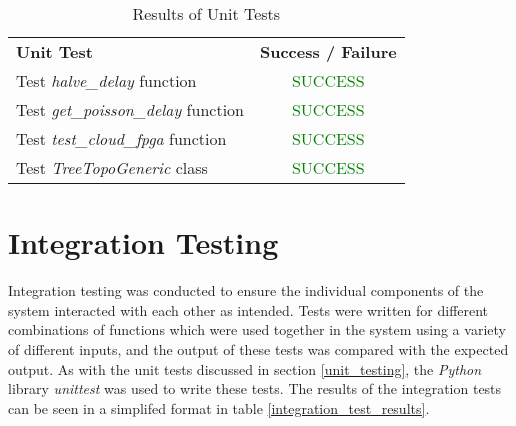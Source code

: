 \begin{table}[t]
  \caption{Results of Unit Tests}
  \begin{center}
    \begin{tabularx}{\textwidth}{|Y|c|} \hline
      \textbf{Unit Test} & \textbf{Success / Failure} \\ \thickhline
      Test \textit{halve\_delay} function & \textcolor{green}{SUCCESS} \\ \hline
      Test \textit{get\_poisson\_delay} function & \textcolor{green}{SUCCESS} \\ \hline
      Test \textit{test\_cloud\_fpga} function & \textcolor{green}{SUCCESS} \\ \hline
      Test \textit{TreeTopoGeneric} class & \textcolor{green}{SUCCESS} \\ \hline
    \end{tabularx}
  \end{center}
  \label{unit_test_results}
\end{table}

\newpage

\section{Integration Testing}
\label{integration_testing}
Integration testing was conducted to ensure the individual components of the system interacted with each other as intended.
Tests were written for different combinations of functions which were used together in the system using a variety of different inputs, and the output of these tests was compared with the expected output.
As with the unit tests discussed in section \ref{unit_testing}, the \textit{Python} library \textit{unittest} was used to write these tests.
The results of the integration tests can be seen in a simplifed format in table \ref{integration_test_results}.

